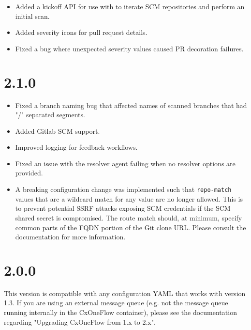 \begin{itemize}
    \item Added a kickoff API for use with 
          to iterate SCM repositories and perform an initial scan.
    \item Added severity icons for pull request details.
    \item Fixed a bug where unexpected severity values caused PR decoration failures.
\end{itemize}


\section{2.1.0}

\begin{itemize}
    \item Fixed a branch naming bug that affected names of scanned branches that had "/" separated segments.
    \item Added Gitlab SCM support.
    \item Improved logging for feedback workflows.
    \item Fixed an issue with the resolver agent failing when no resolver options are provided.
    \item A breaking configuration change was implemented such that \texttt{repo-match} values that are a wildcard
          match for any value are no longer allowed.  This is to prevent potential SSRF attacks exposing SCM credentials
          if the SCM shared secret is compromised.  The route match should, at minimum, specify common parts of the FQDN
          portion of the Git clone URL. Please consult the documentation for more information.
\end{itemize}


\section{2.0.0}

This version is compatible with any configuration YAML that works with version 1.3.  If you are using an external message queue (e.g. not the
message queue running internally in the CxOneFlow container), please see the documentation regarding "Upgrading CxOneFlow from 1.x to 2.x".

